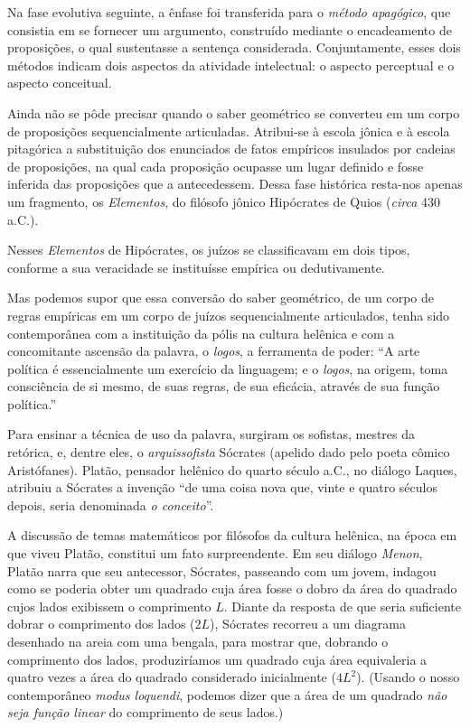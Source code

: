 \documentclass{hipatia}
\begin{document}
Na fase evolutiva seguinte, a ênfase foi transferida para o \emph{método apagógico}, que consistia em se fornecer um argumento, construído mediante o encadeamento de proposições, o qual sustentasse a sentença considerada. Conjuntamente, esses dois métodos indicam dois aspectos da atividade intelectual: o aspecto perceptual e o aspecto conceitual.  \cite[p. 121]{otte2006}

Ainda não se pôde precisar quando o saber geométrico se converteu em um corpo de proposições sequencialmente articuladas. Atribui-se à escola jônica e à escola pitagórica a substituição dos enunciados de fatos empíricos insulados por cadeias de proposições, na qual cada proposição ocupasse um lugar definido e fosse inferida das proposições que a antecedessem. Dessa fase histórica resta-nos apenas um fragmento, os \emph{Elementos}, do filósofo jônico Hipócrates de Quios (\emph{circa} 430 a.C.).  \cite[p. 120]{kagan1986}\cite[p. 1]{sommerville1958}\cite[p. 39--40]{struik1987}

Nesses \emph{Elementos} de Hipócrates, os juízos se classificavam em dois tipos, conforme a sua veracidade se instituísse empírica ou dedutivamente.  \cite[p. 12]{smogorzhevski1976}

Mas podemos supor que essa conversão do saber geométrico, de um corpo de regras empíricas em um corpo de juízos sequencialmente articulados, tenha sido contemporânea com a instituição da pólis na cultura helênica e com a concomitante ascensão da palavra, o \emph{logos}, a ferramenta de poder: ``A arte política é essencialmente um exercício da linguagem; e o \emph{logos}, na origem, toma consciência de si mesmo, de suas regras, de sua eficácia, através de sua função política.'' \cite[p. 17]{chatelet1994}\cite[p. 35]{vernant1984}

Para ensinar a técnica de uso da palavra, surgiram os sofistas, mestres da retórica, e, dentre eles, o \emph{arquissofista} Sócrates (apelido dado pelo poeta cômico Aristófanes).  Platão, pensador helênico do quarto século a.C., no diálogo Laques, atribuiu a Sócrates a invenção ``de uma coisa nova que, vinte e quatro séculos depois, seria denominada \emph{o conceito}''. \cite[p. 20]{chatelet1994}

A discussão de temas matemáticos por filósofos da cultura helênica, na época em que viveu Platão, constitui um fato surpreendente. Em seu diálogo \emph{Menon}, Platão narra que seu antecessor, Sócrates, passeando com um jovem, indagou como se poderia obter um quadrado cuja área fosse o dobro da área do quadrado cujos lados exibissem o comprimento $L$. Diante da resposta de que seria suficiente dobrar o comprimento dos lados  ($2L$), Sócrates recorreu a um diagrama desenhado na areia com uma bengala, para mostrar que, dobrando o comprimento dos lados,  produziríamos um quadrado cuja área equivaleria a quatro vezes a área do quadrado considerado inicialmente  ($4L^2$). (Usando o nosso contemporâneo \emph{modus loquendi}, podemos dizer que a área de um quadrado \emph{não seja função linear} do comprimento de seus lados.)
\end{document}
